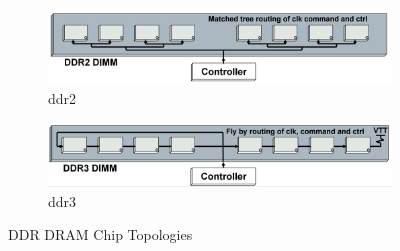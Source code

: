 \begin{figure}[!htb]
  \centering
  \begin{subfigure}[b]{0.4\textwidth}
    \includegraphics[width=\textwidth]{figs/ddr2-topology}
    \caption{ddr2}
    \label{fig:ddr2-chips}
  \end{subfigure}

  \begin{subfigure}[b]{0.4\textwidth}
    \includegraphics[width=\textwidth]{figs/ddr3-topology}
    \caption{ddr3}
    \label{fig:ddr3-chips}
  \end{subfigure}
  \caption{DDR DRAM Chip Topologies \cite{ddr-design}}
  \label{dram-chips}
\end{figure}
